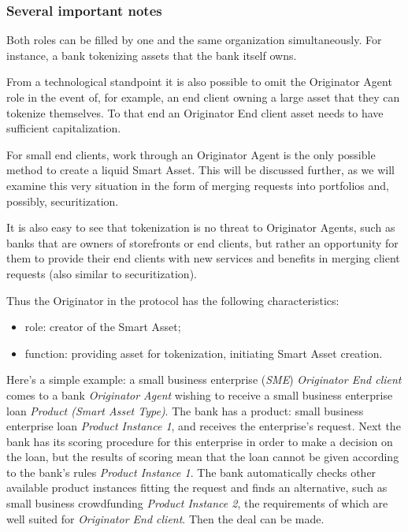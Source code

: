 \documentclass{article}
\begin{document}
\begin{multicols}{2}
\subsubsection*{Several important notes}

Both roles can be filled by one and the same organization simultaneously. For instance, a bank tokenizing assets that the bank itself owns. 

From a technological standpoint it is also possible to omit the Originator Agent role in the event of, for example, an end client owning a large asset that they can tokenize themselves. To that end an Originator End client asset needs to have sufficient capitalization. 

For small end clients, work through an Originator Agent is the only possible method to create a liquid Smart Asset. This will be discussed further, as we will examine this very situation in the form of merging requests into portfolios and, possibly, securitization. 

It is also easy to see that tokenization is no threat to Originator Agents, such as banks that are owners of storefronts or end clients, but rather an opportunity for them to provide their end clients with new services and benefits in merging client requests (also similar to securitization).

Thus the Originator in the protocol has the following characteristics:

\begin{itemize}
\item role: creator of the Smart Asset;
\item function: providing asset for tokenization, initiating Smart Asset creation.
\end{itemize}

Here’s a simple example: a small business enterprise (\textit{SME}) \textit{Originator End client} comes to a bank \textit{Originator Agent} wishing to receive a small business enterprise loan \textit{Product (Smart Asset Type)}. The bank has a product: small business enterprise loan \textit{Product Instance 1}, and receives the enterprise’s request. Next the bank has its scoring procedure for this enterprise in order to make a decision on the loan, but the results of scoring mean that the loan cannot be given according to the bank’s rules \textit{Product Instance 1}. The bank automatically checks other available product instances fitting the request and finds an alternative, such as small business crowdfunding \textit{Product Instance 2}, the requirements of which are well suited for \textit{Originator End client}. Then the deal can be made.


\end{multicols}
\end{document}
